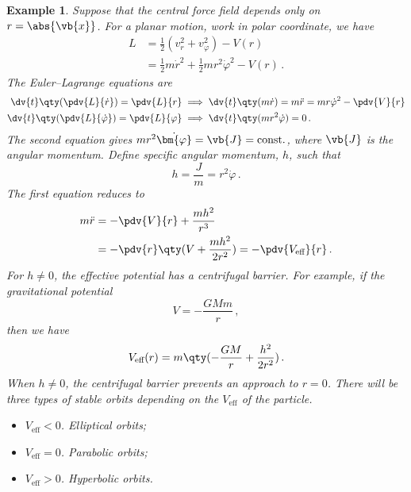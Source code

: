 \documentclass{article}
\theoremstyle{plain}\theoremheaderfont{\normalfont\itshape}\theorembodyfont{\rmfamily}\theoremseparator{.}\newtheorem*{rem}{Remark}\newtheorem*{ex}{Example}\newtheorem*{proof}{Proof}\newtheorem*{altp}{Alternative proof}
\theoremstyle{plain}\theoremheaderfont{\normalfont\bfseries}\theorembodyfont{\rmfamily}\theoremseparator{.}\newtheorem{thm}{Theorem}[section]\newtheorem{lem}[thm]{Lemma}\newtheorem{prop}[thm]{Proposition}\newtheorem*{cor}{Corollary}\newtheorem{defn}[thm]{Definition}\newtheorem{clm}[thm]{Claim}\newtheorem{clminproof}{Claim}
\theoremstyle{break}\theoremheaderfont{\normalfont\itshape}\theorembodyfont{\rmfamily}\theoremseparator{.\medskip}\newtheorem*{proofskip}{Proof}\newtheorem*{exs}{Examples}\newtheorem*{rems}{Remarks}
\theoremstyle{break}\theoremheaderfont{\normalfont\bfseries}\theorembodyfont{\rmfamily}\theoremseparator{.\medskip}\newtheorem{lemskip}[thm]{Lemma}\newtheorem{defnskip}[thm]{Definition}\newtheorem{propskip}[thm]{Proposition}\newtheorem{thmskip}[thm]{Theorem}
\numberwithin{equation}{section}
\begin{document}
	\begin{ex}
		Suppose that the central force field depends only on \(r=\abs{\vb{x}}\). For a planar motion, work in polar coordinate, we have
		\begin{align*}
			L&=\frac{1}{2}(v_r^2+v_\varphi^2)-V(r)\\
			&=\frac{1}{2}m\dot{r}^2+\frac{1}{2}mr^2\dot{\varphi}^2-V(r)\,.
		\end{align*}
		The Euler--Lagrange equations are
		\begin{align*}
			\dv{t}\qty(\pdv{L}{\dot{r}})=\pdv{L}{r} &\implies \dv{t}\qty(m\dot{r})=m\ddot{r}=mr\dot{\varphi}^2-\pdv{V}{r}\\
			\dv{t}\qty(\pdv{L}{\dot{\varphi}})=\pdv{L}{\varphi} &\implies \dv{t}\qty(mr^2\dot{\varphi})=0\,.
		\end{align*}
		The second equation gives \(mr^2\dot{\bm{\varphi}}=\vb{J}=\text{const.}\), where \(\vb{J}\) is the angular momentum. Define specific angular momentum, \(h\), such that
		\[h=\frac{J}{m}=r^2\dot{\varphi}\,.\]
		The first equation reduces to
		\begin{align*}
			m\ddot{r}&=-\pdv{V}{r}+\frac{mh^2}{r^3}\\
			&=-\pdv{r}\qty(V+\frac{mh^2}{2r^2})=-\pdv{V_{\text{eff}}}{r}\,.
		\end{align*}
		For \(h\ne 0\), the effective potential has a centrifugal barrier. For example, if the gravitational potential
		\[V=-\frac{GMm}{r}\,,\]
		then we have
		\[V_{\text{eff}}(r)=m\qty(-\frac{GM}{r}+\frac{h^2}{2r^2})\,.\]
		When \(h\ne 0\), the centrifugal barrier prevents an approach to \(r=0\). There will be three types of stable orbits depending on the \(V_\text{eff}\) of the particle.
		\begin{itemize}[topsep=0pt]
			\item \(V_\text{eff}<0\). Elliptical orbits;
			\item \(V_\text{eff}=0\). Parabolic orbits;
			\item \(V_\text{eff}>0\). Hyperbolic orbits.
		\end{itemize}
	\end{ex}
\end{document}
